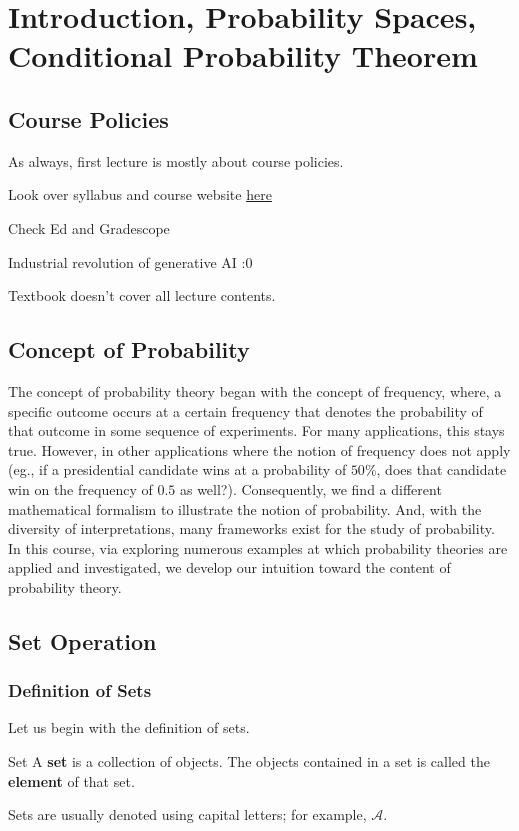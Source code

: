 \chapter{Introduction, Probability Spaces, Conditional Probability Theorem}

\section*{Course Policies}
As always, first lecture is mostly about course policies.
\begin{bindenum}
    \item Look over syllabus and course website \href{https://inst.eecs.berkeley.edu/~ee126/sp24/}{here}
    \item Check Ed and Gradescope
    \item Industrial revolution of generative AI :0
\end{bindenum}
Textbook doesn't cover all lecture contents.

\section*{Concept of Probability}
The concept of probability theory began with the concept of frequency, where, a specific outcome occurs at a certain frequency that denotes the probability of that outcome in some sequence of experiments.
For many applications, this stays true.
However, in other applications where the notion of frequency does not apply (eg., if a presidential candidate wins at a probability of $50\%$, does that candidate win on the frequency of $0.5$ as well?).
Consequently, we find a different mathematical formalism to illustrate the notion of probability.
And, with the diversity of interpretations, many frameworks exist for the study of probability.
In this course, via exploring numerous examples at which probability theories are applied and investigated, we develop our intuition toward the content of probability theory.

\section{Set Operation}
\subsection{Definition of Sets}
Let us begin with the definition of sets.
\begin{ln-define}{Set}{}
    A \textbf{set} is a collection of objects. The objects contained in a set is called the \textbf{element} of that set.
\end{ln-define}
Sets are usually denoted using capital letters; for example, $\mathcal{A}$.

